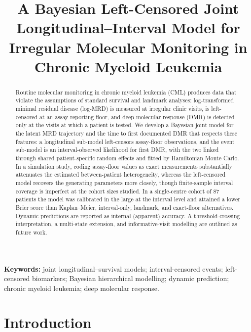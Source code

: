 \documentclass[11pt]{article}
\title{A Bayesian Left-Censored Joint Longitudinal--Interval Model for
Irregular Molecular Monitoring in Chronic Myeloid Leukemia}
\author{}     %
\date{}
\begin{document}
\maketitle

\begin{abstract}
Routine molecular monitoring in chronic myeloid leukemia (CML) produces
data that violate the assumptions of standard survival and landmark
analyses: log-transformed minimal residual disease (log-MRD) is measured
at irregular clinic visits, is left-censored at an assay reporting floor,
and deep molecular response (DMR) is detected only at the visits at which a
patient is tested. We develop a Bayesian joint model for the latent MRD
trajectory and the time to first documented DMR that respects these
features: a longitudinal sub-model left-censors assay-floor observations,
and the event sub-model is an interval-observed likelihood for first DMR,
with the two linked through shared patient-specific random effects and
fitted by Hamiltonian Monte Carlo. In a simulation study, coding
assay-floor values as exact measurements substantially attenuates the
estimated between-patient heterogeneity, whereas the left-censored model
recovers the generating parameters more closely, though finite-sample
interval coverage is imperfect at the cohort sizes studied. In a single-centre cohort of 87 patients the model was calibrated in the
large at the interval level and attained a lower Brier score than
Kaplan--Meier, interval-only, landmark, and exact-floor alternatives.
Dynamic predictions are reported as internal (apparent) accuracy. A threshold-crossing
interpretation, a multi-state extension, and informative-visit modelling are
outlined as future work.
\end{abstract}

\noindent\textbf{Keywords:} joint longitudinal--survival models;
interval-censored events; left-censored biomarkers; Bayesian hierarchical
modelling; dynamic prediction; chronic myeloid leukemia; deep molecular
response.

\section{Introduction}
\end{document}
